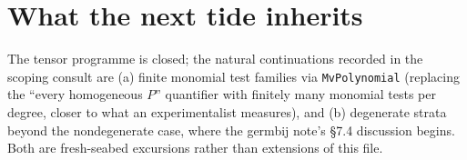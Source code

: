 \documentclass[11pt]{article}
\newcommand{\code}[1]{\texttt{#1}}
\begin{document}
\section{What the next tide inherits}

The tensor programme is closed; the natural continuations recorded in
the scoping consult are (a) finite monomial test families via
\code{MvPolynomial} (replacing the ``every homogeneous $P$''
quantifier with finitely many monomial tests per degree, closer to
what an experimentalist measures), and (b) degenerate strata beyond
the nondegenerate case, where the germbij note's \S7.4 discussion
begins. Both are fresh-seabed excursions rather than extensions of
this file.
\end{document}
